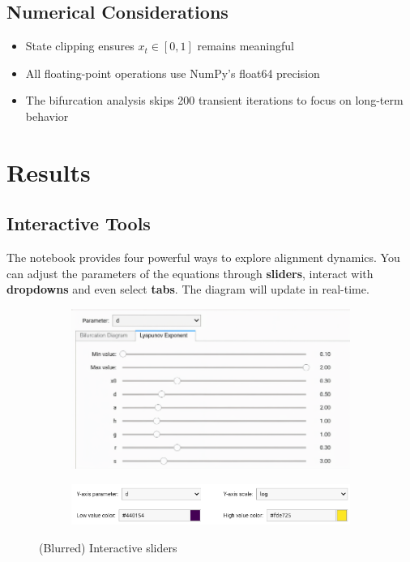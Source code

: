 \documentclass[a4paper, 10pt]{article}
\begin{document}
\subsection{Numerical Considerations}
\begin{itemize}
	\item State clipping ensures $x_t \in [0,1]$ remains meaningful
	\item All floating-point operations use NumPy's float64 precision
	\item The bifurcation analysis skips 200 transient iterations to focus on long-term behavior
\end{itemize}

\clearpage
\section{Results}
\label{sec:results}
\subsection{Interactive Tools}
The notebook provides four powerful ways to explore alignment dynamics. 
You can adjust the parameters of the equations through \textbf{sliders}, interact with \textbf{dropdowns} and even select \textbf{tabs}. The diagram will update in real-time.

\begin{figure}[h!]
    \centering
    \begin{subfigure}{0.45\textwidth}
        \centering
        \includegraphics[width=\linewidth]{../images/results/slid-1.pdf}
        \label{fig:sliders1}
    \end{subfigure}
    \hfill
    \begin{subfigure}{0.45\textwidth}
        \centering
        \includegraphics[width=\linewidth]{../images/results/slid-2.png}
        \label{fig:sliders2}
    \end{subfigure}
    \caption{(Blurred) Interactive sliders}
    \label{fig:side_by_side}
\end{figure}
\end{document}
